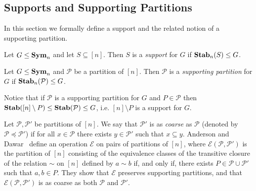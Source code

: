 \documentclass[../paper.tex]{subfiles}
\begin{document}

\subsection{Supports and Supporting Partitions}
In this section we formally define a support and the related notion of a
supporting partition.

\begin{definition}
  Let $G \leq \text{\textbf{Sym}}_n$ and let $S \subseteq [n]$. Then $S$ is a \emph{support}
  for $G$ if $\text{\textbf{Stab}}_n(S) \leq G$.
\end{definition}

\begin{definition}
  Let $G \leq \text{\textbf{Sym}}_n$ and $\mathcal{P}$ be a partition of $[n]$. Then
  $\mathcal{P}$ is a \emph{supporting partition} for $G$ if
  $\text{\textbf{Stab}}_n(\mathcal{P}) \leq G$.
\end{definition}

Notice that if $\mathcal{P}$ is a supporting partition for $G$ and $P \in
\mathcal{P}$ then $\text{\textbf{Stab}}([n] \setminus P) \leq \text{\textbf{Stab}}(\mathcal{P}) \leq G$, i.e.
$[n] \setminus P$ is a support for $G$.

Let $\mathcal{P}, \mathcal{P}'$ be partitions of $[n]$. We say that
$\mathcal{P}'$ is as \emph{coarse} as $\mathcal{P}$ (denoted by $\mathcal{P}
\preceq \mathcal{P}'$) if for all $x \in \mathcal{P}$ there exists $y \in
\mathcal{P}'$ such that $x \subseteq y$. Anderson and Dawar~\cite{AndersonD17}
define an operation $\mathcal{E}$ on pairs of partitions of $[n]$, where
$\mathcal{E} (\mathcal{P}, \mathcal{P}')$ is the partition of $[n]$ consisting
of the equivalence classes of the transitive closure of the relation $\sim$ on
$[n]$ defined by $a \sim b$ if, and only if, there exists $P \in \mathcal{P}
\cup \mathcal{P}'$ such that $a,b \in P$. They show that $\mathcal{E}$ preserves
supporting partitions, and that $\mathcal{E}(\mathcal{P}, \mathcal{P}')$ is as
coarse as both $\mathcal{P}$ and $\mathcal{P}'$.
\end{document}
